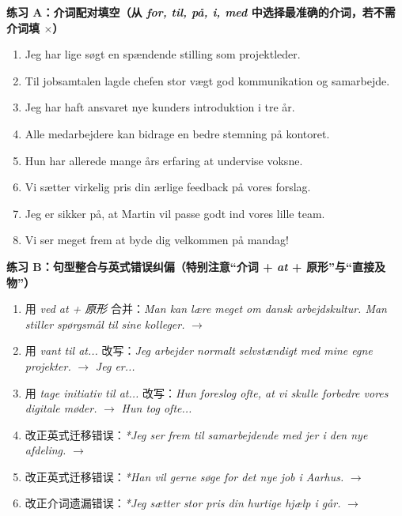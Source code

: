 \textbf{练习 A：介词配对填空（从 \textit{for, til, på, i, med} 中选择最准确的介词，若不需介词填 $\times$）}
\begin{enumerate}
  \item Jeg har lige søgt \underline{\hspace{1.8cm}} en spændende stilling som projektleder.
  \item Til jobsamtalen lagde chefen stor vægt \underline{\hspace{1.8cm}} god kommunikation og samarbejde.
  \item Jeg har haft ansvaret \underline{\hspace{1.8cm}} nye kunders introduktion i tre år.
  \item Alle medarbejdere kan bidrage \underline{\hspace{1.8cm}} en bedre stemning på kontoret.
  \item Hun har allerede mange års erfaring \underline{\hspace{1.8cm}} at undervise voksne.
  \item Vi sætter virkelig pris \underline{\hspace{1.8cm}} din ærlige feedback på vores forslag.
  \item Jeg er sikker på, at Martin vil passe godt ind \underline{\hspace{1.8cm}} vores lille team.
  \item Vi ser meget frem \underline{\hspace{1.8cm}} at byde dig velkommen på mandag!
\end{enumerate}

\textbf{练习 B：句型整合与英式错误纠偏（特别注意“介词 + \textit{at} + 原形”与“直接及物”）}
\begin{enumerate}
  \item 用 \textit{ved at + 原形} 合并：\textit{Man kan lære meget om dansk arbejdskultur. Man stiller spørgsmål til sine kolleger.} $\rightarrow$
  \item 用 \textit{vant til at...} 改写：\textit{Jeg arbejder normalt selvstændigt med mine egne projekter.} $\rightarrow$ \textit{Jeg er...}
  \item 用 \textit{tage initiativ til at...} 改写：\textit{Hun foreslog ofte, at vi skulle forbedre vores digitale møder.} $\rightarrow$ \textit{Hun tog ofte...}
  \item 改正英式迁移错误：\textit{*Jeg ser frem til samarbejdende med jer i den nye afdeling.} $\rightarrow$
  \item 改正英式迁移错误：\textit{*Han vil gerne søge for det nye job i Aarhus.} $\rightarrow$
  \item 改正介词遗漏错误：\textit{*Jeg sætter stor pris din hurtige hjælp i går.} $\rightarrow$
\end{enumerate}

